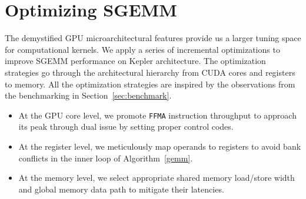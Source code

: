 \section{Optimizing SGEMM}
\label{sec:optimization}


The demystified GPU microarchitectural features provide us a larger tuning space for computational kernels.
We apply
a series of incremental optimizations to improve SGEMM performance on Kepler architecture. The optimization strategies
go through the architectural hierarchy from CUDA cores and registers to memory. All the optimization strategies are
inspired by the observations from the benchmarking in Section~\ref{sec:benchmark}.
\begin{itemize}
\item At the GPU core level, we promote {\tt FFMA} instruction throughput to approach its peak through dual issue by setting proper control codes.
\item At the register level, we meticulously map operands to registers to avoid bank conflicts in the inner loop of Algorithm~\ref{gemm}.
\item At the memory level, we select appropriate shared memory load/store width and global memory data path to mitigate their latencies.
\end{itemize}





